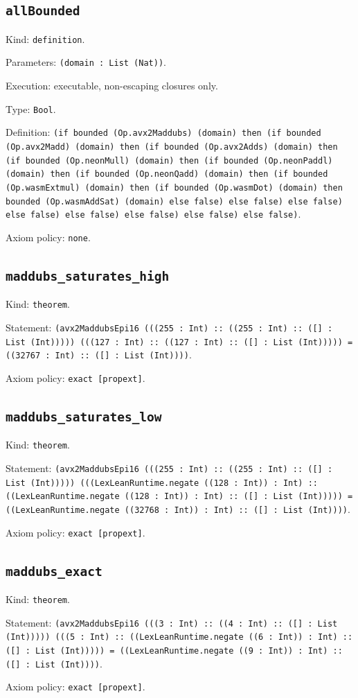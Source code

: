 \documentclass[11pt]{article}
\begin{document}
\subsection*{\texttt{allBounded}}
\noindent Kind: \texttt{definition}.\par
\noindent Parameters: \texttt{(domain : List (Nat))}.\par
\noindent Execution: executable, non-escaping closures only.\par
\noindent Type: \texttt{Bool}.\par
\noindent Definition: \texttt{(if bounded (Op.avx2Maddubs) (domain) then (if bounded (Op.avx2Madd) (domain) then (if bounded (Op.avx2Adds) (domain) then (if bounded (Op.neonMull) (domain) then (if bounded (Op.neonPaddl) (domain) then (if bounded (Op.neonQadd) (domain) then (if bounded (Op.wasmExtmul) (domain) then (if bounded (Op.wasmDot) (domain) then bounded (Op.wasmAddSat) (domain) else false) else false) else false) else false) else false) else false) else false) else false)}.\par
\noindent Axiom policy: \texttt{none}.\par
\subsection*{\texttt{maddubs\_saturates\_high}}
\noindent Kind: \texttt{theorem}.\par
\noindent Statement: \texttt{(avx2MaddubsEpi16 (((255 : Int) :: ((255 : Int) :: ([] : List (Int))))) (((127 : Int) :: ((127 : Int) :: ([] : List (Int))))) = ((32767 : Int) :: ([] : List (Int))))}.\par
\noindent Axiom policy: \texttt{exact [propext]}.\par
\subsection*{\texttt{maddubs\_saturates\_low}}
\noindent Kind: \texttt{theorem}.\par
\noindent Statement: \texttt{(avx2MaddubsEpi16 (((255 : Int) :: ((255 : Int) :: ([] : List (Int))))) (((LexLeanRuntime.negate ((128 : Int)) : Int) :: ((LexLeanRuntime.negate ((128 : Int)) : Int) :: ([] : List (Int))))) = ((LexLeanRuntime.negate ((32768 : Int)) : Int) :: ([] : List (Int))))}.\par
\noindent Axiom policy: \texttt{exact [propext]}.\par
\subsection*{\texttt{maddubs\_exact}}
\noindent Kind: \texttt{theorem}.\par
\noindent Statement: \texttt{(avx2MaddubsEpi16 (((3 : Int) :: ((4 : Int) :: ([] : List (Int))))) (((5 : Int) :: ((LexLeanRuntime.negate ((6 : Int)) : Int) :: ([] : List (Int))))) = ((LexLeanRuntime.negate ((9 : Int)) : Int) :: ([] : List (Int))))}.\par
\noindent Axiom policy: \texttt{exact [propext]}.\par
\end{document}
